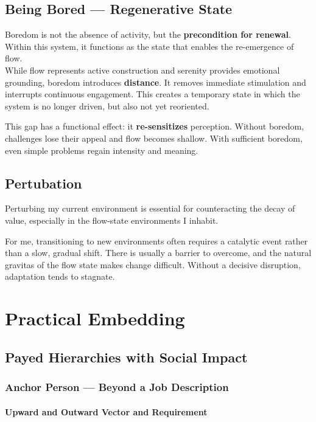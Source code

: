 \subsection{Being Bored — Regenerative State}

Boredom is not the absence of activity, but the \textbf{precondition for renewal}. Within this system, it functions as the state that enables the re-emergence of flow.\\

While flow represents active construction and serenity provides emotional grounding, boredom introduces \textbf{distance}. It removes immediate stimulation and interrupts continuous engagement. This creates a temporary state in which the system is no longer driven, but also not yet reoriented.

This gap has a functional effect: it \textbf{re-sensitizes} perception. Without boredom, challenges lose their appeal and flow becomes shallow. With sufficient boredom, even simple problems regain intensity and meaning.

\subsection{Pertubation}

 Perturbing my current environment is essential for counteracting the decay of value, especially in the flow-state environments I inhabit.
 
 For me, transitioning to new environments often requires a catalytic event rather than a slow, gradual shift. There is usually a barrier to overcome, and the natural gravitas of the flow state makes change difficult. Without a decisive disruption, adaptation tends to stagnate.



\section{Practical Embedding}

\subsection{Payed Hierarchies with Social Impact} \label{PR_PHSI}

\subsubsection{Anchor Person — Beyond a Job Description}
\paragraph{Upward and Outward Vector and Requirement}

